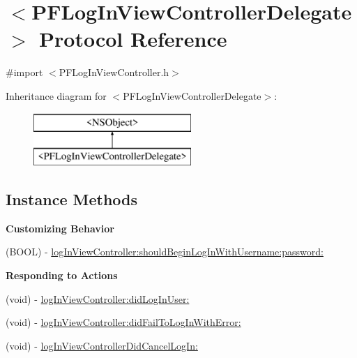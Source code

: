 \hypertarget{protocol_p_f_log_in_view_controller_delegate-p}{}\section{$<$P\+F\+Log\+In\+View\+Controller\+Delegate$>$ Protocol Reference}
\label{protocol_p_f_log_in_view_controller_delegate-p}


{\ttfamily \#import $<$P\+F\+Log\+In\+View\+Controller.\+h$>$}

Inheritance diagram for $<$P\+F\+Log\+In\+View\+Controller\+Delegate$>$\+:\begin{figure}[H]
\begin{center}
\leavevmode
\includegraphics[height=2.000000cm]{protocol_p_f_log_in_view_controller_delegate-p}
\end{center}
\end{figure}
\subsection*{Instance Methods}
\begin{Indent}{\bf Customizing Behavior}\par
{\em 

 

 }\begin{DoxyCompactItemize}
\item 
(B\+O\+O\+L) -\/ \hyperlink{protocol_p_f_log_in_view_controller_delegate-p_a60cfb2662f46527be38db7fb01227d03}{log\+In\+View\+Controller\+:should\+Begin\+Log\+In\+With\+Username\+:password\+:}
\end{DoxyCompactItemize}
\end{Indent}
\begin{Indent}{\bf Responding to Actions}\par
{\em 

 

 }\begin{DoxyCompactItemize}
\item 
(void) -\/ \hyperlink{protocol_p_f_log_in_view_controller_delegate-p_aa9813f265c5c79668c0e175f259f72e0}{log\+In\+View\+Controller\+:did\+Log\+In\+User\+:}
\item 
(void) -\/ \hyperlink{protocol_p_f_log_in_view_controller_delegate-p_a5b8e48859f7cf1fa1bf20d9bb7da4421}{log\+In\+View\+Controller\+:did\+Fail\+To\+Log\+In\+With\+Error\+:}
\item 
(void) -\/ \hyperlink{protocol_p_f_log_in_view_controller_delegate-p_a5d25a707aa54c6497a39298095690974}{log\+In\+View\+Controller\+Did\+Cancel\+Log\+In\+:}
\end{DoxyCompactItemize}
\end{Indent}


